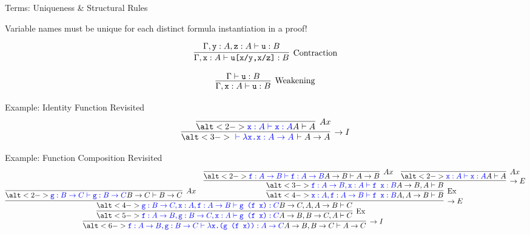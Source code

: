 \documentclass{beamer}
\newcommand{\term}[1]{\texttt{#1}}
\begin{document}
\begin{frame}{Terms: Uniqueness \& Structural Rules}

	Variable names must be \alert{unique} for each distinct formula instantiation in a proof!

	\[
		\infer[\text{Contraction}]{\Gamma, \term{x}: A \vdash
		\term{u[x/y,x/z]}: B}{
			\Gamma, \term{y}: A, \term{z}: A \vdash \term{u}:B
		}
	\]
	
	\[
		\infer[\text{Weakening}]{\Gamma, \term{x}:A \vdash \term{u}:B}{\Gamma \vdash \term{u}:B}
	\]
\end{frame}

\begin{frame}{Example: Identity Function Revisited}
	\[
		\infer[\to I]{\alt<3->{\textcolor{blue}{\ \vdash \lambda\term{x.x}: A \to A}}{\ \vdash A\to A}}{
			\infer[Ax]{\alt<2->{\textcolor{blue}{\term{x}: A \vdash \term{x}: A}}{A \vdash A}}{}
		}
	\]
\end{frame}


\begin{frame}{Example: Function Composition Revisited}
	\footnotesize
	\[
		\infer[\to I]{\alt<6->{\textcolor{blue}{\term{f}: A\to B, \term{g}: B\to C \vdash \lambda\term{x.(g (f x))}:A\to C}}{A\to B, B\to C \vdash A\to C}}{
			\infer[\text{Ex}]{\alt<5->{\textcolor{blue}{\term{f}: A\to B, \term{g}: B\to C, \term{x}: A \vdash \term{g (f x)}: C}}{A\to B, B\to C, A \vdash C}}{
				\infer[\to E]{\alt<4->{\textcolor{blue}{\term{g}: B\to C, \term{x}: A, \term{f}: A\to B \vdash \term{g (f x)}: C}}{B\to C, A, A\to B \vdash C}}{
					\infer[Ax]{\alt<2->{\textcolor{blue}{\term{g}: B\to C \vdash \term{g}:B\to C}}{B \to C \vdash B \to C}}{}
					&
					\infer[\text{Ex}]{\alt<4->{\textcolor{blue}{\term{x}: A, \term{f}: A\to B \vdash \term{f x}: B}}{A, A\to B \vdash B}}{
						\infer[\to E]{\alt<3->{\textcolor{blue}{\term{f}: A \to B, \term{x}: A \vdash \term{f x}: B}}{A\to B, A \vdash B}}{
							\infer[Ax]{\alt<2->{\textcolor{blue}{\term{f}: A\to B \vdash \term{f}: A\to B}}{A\to B \vdash A \to B}}{}
							&
							\infer[Ax]{\alt<2->{\textcolor{blue}{\term{x}: A \vdash \term{x}: A}}{A \vdash A}}{}
						}
					}
				}
			}
		}
	\]
\end{frame}
\end{document}
